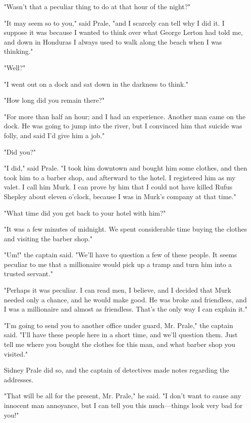 \documentclass{novel}
\begin{document}
"Wasn't that a peculiar thing to do at that hour of the night?"

"It may seem so to you," said Prale, "and I scarcely can tell why I did it. I suppose it was because I wanted to think over what George Lerton had told me, and down in Honduras I always used to walk along the beach when I was thinking."

"Well?"

"I went out on a dock and sat down in the darkness to think."

"How long did you remain there?"

"For more than half an hour; and I had an experience. Another man came on the dock. He was going to jump into the river, but I convinced him that suicide was folly, and said I'd give him a job."

"Did you?"

"I did," said Prale. "I took him downtown and bought him some clothes, and then took him to a barber shop, and afterward to the hotel. I registered him as my valet. I call him Murk. I can prove by him that I could not have killed Rufus Shepley about eleven o'clock, because I was in Murk's company at that time."

"What time did you get back to your hotel with him?"

"It was a few minutes of midnight. We spent considerable time buying the clothes and visiting the barber shop."

"Um!" the captain said. "We'll have to question a few of these people. It seems peculiar to me that a millionaire would pick up a tramp and turn him into a trusted servant."

"Perhaps it was peculiar. I can read men, I believe, and I decided that Murk needed only a chance, and he would make good. He was broke and friendless, and I was a millionaire and almost as friendless. That's the only way I can explain it."

"I'm going to send you to another office under guard, Mr. Prale," the captain said. "I'll have these people here in a short time, and we'll question them. Just tell me where you bought the clothes for this man, and what barber shop you visited."

Sidney Prale did so, and the captain of detectives made notes regarding the addresses.

"That will be all for the present, Mr. Prale," he said. "I don't want to cause any innocent man annoyance, but I can tell you this much---things look very bad for you!"
\end{document}
